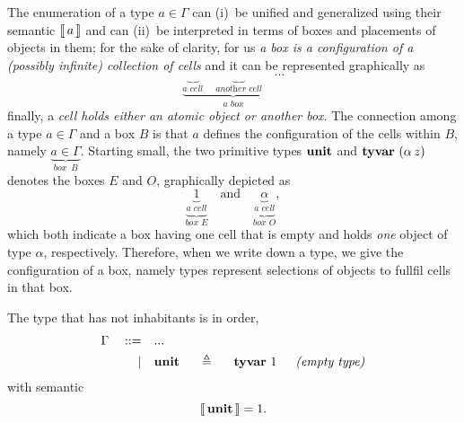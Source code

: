 The enumeration of a type $a\in\Gamma$ can (i)~be unified and generalized using
their semantic $\left\llbracket\,a\,\right\rrbracket$ and can (ii)~be interpreted in terms of boxes and
placements of objects in them; for the sake of clarity, for us \textit{a box is
a configuration of a (possibly infinite) collection of cells} and it can be represented graphically as
\begin{displaymath}
\underbrace{\underbrace{\quad}_{\textit{a cell}}\quad\underbrace{\quad}_{\textit{another cell}}\quad\cdots}_{\textit{a box}}
\end{displaymath}
finally, a \textit{cell holds either an atomic object or another box}. The
connection among a type $a\in\Gamma$ and a box $B$ is that $a$ defines the
configuration of the cells within $B$, namely $\displaystyle
\underbrace{a\in\Gamma}_{\textit{box }\,B}$.  Starting small, the two primitive types
$\textbf{unit}$ and $\textbf{tyvar}\,\,(\alpha\,z)$ denotes the boxes $E$ and $O$, graphically depicted as
\begin{displaymath}
\underbrace{\underbrace{1}_{\textit{a cell}}}_{\textit{box E}}\quad\text{and}\quad
\underbrace{\underbrace{\alpha}_{\textit{a cell}}}_{\textit{box O}},
\end{displaymath}
which both indicate a box having one cell that is empty and holds \textit{one}
object of type $\alpha$, respectively.  Therefore, when we write down a type,
we give the configuration of a box, namely types represent selections of
objects to fullfil cells in that box.

\begin{definition}[\tyunit]
The type that has not inhabitants is in order,
\begin{displaymath}
\begin{split}
    \Gamma\quad::=\quad&... \\
           |\quad&\tydef{\tyunit}{\tyvar{1}}{empty type}\\
\end{split}
\end{displaymath}
with semantic
\begin{displaymath}
    \left\llbracket\,\textbf{unit}\,\right\rrbracket = 1.
\end{displaymath}
\end{definition}

